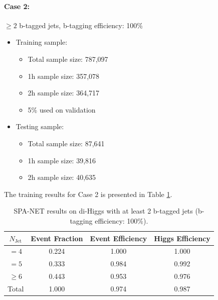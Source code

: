 \documentclass[12pt]{article}
\begin{document}
		\paragraph{Case 2:} $\ge 2$ b-tagged jets, b-tagging efficiency: 100\% 
		\begin{itemize}
			\item Training sample:
			\begin{itemize}
				\item Total sample size: 787,097
				\item 1h sample size: 357,078
				\item 2h sample size: 364,717
				\item 5\% used on validation
			\end{itemize}
			\item Testing sample: 
				\begin{itemize}
					\item Total sample size: 87,641
					\item 1h sample size: 39,816
					\item 2h sample size: 40,635
				\end{itemize}
		\end{itemize}
		The training results for Case 2 is presented in Table \ref{tab:SPANet_2btag_100}.
		\begin{table}[htpb]
			\centering
			\caption{SPA-NET results on di-Higgs with at least 2 b-tagged jets (b-tagging efficiency: 100\%).}
			\label{tab:SPANet_2btag_100}
			\begin{tabular}{c|c|cc}
				$N_\text{Jet}$ & Event Fraction & Event Efficiency & Higgs Efficiency \\
				\hline
				$=4$	  &   0.224             &    1.000              &    1.000             \\
				$=5$	  &   0.333             &    0.984              &    0.992             \\
				$\ge 6$	  &   0.443             &    0.953              &    0.976             \\
				Total	  &   1.000             &    0.974              &    0.987             \\
			\end{tabular}
		\end{table}
\end{document}
